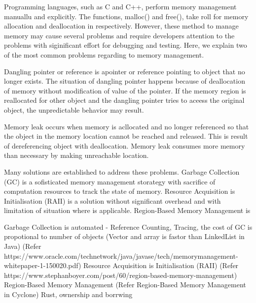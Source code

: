 Programming languages, such as C and C++, perform memory management manuallu and explicitly. The functions, malloc() and free(), take roll for
memory allocation and deallocation in respectively. However, these method to manage memory may cause several problems and require developers 
attention to the problems with siginificant effort for debugging and testing. Here, we explain two of the most common problems regarding to memory management.

Dangling pointer or reference is apointer or reference pointing to object that no longer exists. The situation of dangling pointer happens 
because of deallocation of memory without modification of value of the pointer. 
If the memory region is reallocated for other object and the dangling pointer tries to aceess the original object, the unpredictable behavior may result. 

Memory leak occurs when memory is acllocated and no longer referenced so that the object in the memory location cannot be reached and released.
This is result of dereferencing object with deallocation. Memory leak consumes more memory than necessary by making unreachable location.

Many solutions are established to address these problems. Garbage Collection (GC) is a sofisticated memory management storategy with sacrifice of computation resources 
to track the state of memory. Resource Acquisition is Initialisation (RAII) is a solution without significant overhead and with limitation of situation where is applicable.
Region-Based Memory Management is 


Garbage Collection is automated - Reference Counting, Tracing, the cost of GC is propotional to number of objects (Vector and array is fastor than LinkedList in Java)
(Refer https://www.oracle.com/technetwork/java/javase/tech/memorymanagement-whitepaper-1-150020.pdf)
Resource Acquisition is Initialisation (RAII) (Refer https://www.stephanboyer.com/post/60/region-based-memory-management)
Region-Based Memory Management (Refer Region-Based Memory Management in Cyclone)
Rust, ownership and borrwing 